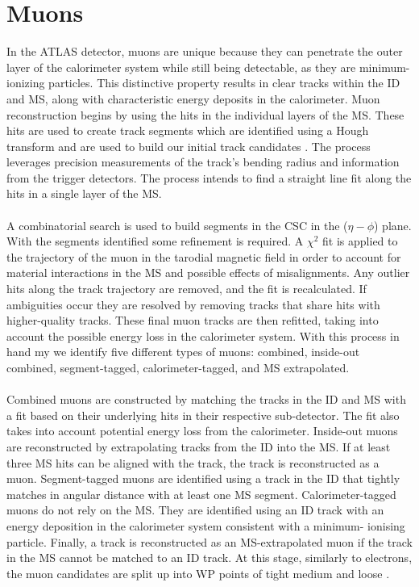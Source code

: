 \section{Muons}
In the ATLAS detector, muons are unique because they can penetrate the outer layer of the calorimeter system while still being detectable, as they are minimum-ionizing particles. This distinctive property results in clear tracks within the ID and MS, along with characteristic energy deposits in the calorimeter. Muon reconstruction begins by using the hits in the individual layers of the MS. These hits are used to create track segments which are identified using a Hough transform and are used to build our initial track candidates \cite{hough}. The process leverages precision measurements of the track’s bending radius and information from the trigger detectors. The process intends to find a straight line fit along the hits in a single layer of the MS. 
\\
\\
A combinatorial search is used to build segments in the CSC in the ($\eta-\phi$) plane. With the segments identified some refinement is required. A $\chi^2$ fit is applied to the trajectory of the muon in the tarodial magnetic field in order to account for material interactions in the MS and possible effects of misalignments. Any outlier hits along the track trajectory are removed, and the fit is recalculated. If ambiguities occur they are resolved by removing tracks that share hits with higher-quality tracks. These final muon tracks are then refitted, taking into account the possible energy loss in the calorimeter system. With this process in hand my we identify five different types of muons: combined, inside-out combined, segment-tagged, calorimeter-tagged, and MS extrapolated.
\\
\\
Combined muons are constructed by matching the tracks in the ID and MS with a fit based on their underlying hits in their respective sub-detector. The fit also takes into account potential energy loss from the calorimeter. Inside-out muons are reconstructed by extrapolating tracks from the ID into the MS. If at least three MS hits can be aligned with the track, the track is reconstructed as a muon. Segment-tagged muons are identified using a track in the ID that tightly matches in angular distance with at least one MS segment. Calorimeter-tagged muons do not rely on the MS. They are identified using an ID track with an energy deposition in the calorimeter system consistent with a minimum- ionising particle. Finally, a track is reconstructed as an MS-extrapolated muon if the track in the MS cannot be matched to an ID track. At this stage, similarly to electrons, the muon candidates are split up into WP points of tight medium and loose \cite{atlas2021muon}.
